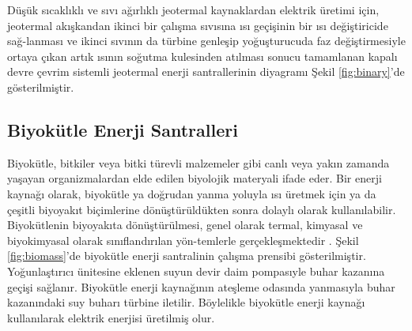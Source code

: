 Düşük sıcaklıklı ve sıvı ağırlıklı jeotermal kaynaklardan elektrik üretimi için, jeotermal akışkandan ikinci bir çalışma sıvısına ısı geçişinin bir ısı değiştiricide sağ-lanması ve ikinci sıvının da türbine genleşip yoğuşturucuda faz değiştirmesiyle ortaya çıkan artık ısının soğutma kulesinden atılması sonucu tamamlanan kapalı devre çevrim sistemli jeotermal enerji santrallerinin diyagramı Şekil \ref{fig:binary}'de gösterilmiştir.

\subsection{Biyokütle Enerji Santralleri}


Biyokütle, bitkiler veya bitki türevli malzemeler gibi canlı veya yakın zamanda yaşayan organizmalardan elde edilen biyolojik materyali ifade eder. Bir enerji kaynağı olarak, biyokütle ya doğrudan yanma yoluyla ısı üretmek için ya da çeşitli biyoyakıt biçimlerine dönüştürüldükten sonra dolaylı olarak kullanılabilir. Biyokütlenin biyoyakıta dönüştürülmesi, genel olarak termal, kimyasal ve biyokimyasal olarak sınıflandırılan yön-temlerle gerçekleşmektedir \cite{speight2022encyclopedia}. Şekil \ref{fig:biomass}'de biyokütle enerji santralinin çalışma prensibi gösterilmiştir. Yoğunlaştırıcı ünitesine eklenen suyun devir daim pompasıyle buhar kazanına geçişi sağlanır. Biyokütle enerji kaynağının ateşleme odasında yanmasıyla buhar kazanındaki suy buharı türbine iletilir. Böylelikle biyokütle enerji kaynağı kullanılarak elektrik enerjisi üretilmiş olur.


